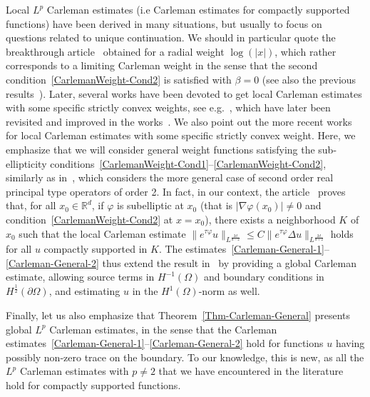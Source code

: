 \documentclass[AHL,Unicode,longabstracts]{cedram}
\newcommand*\R{\mathbb{R}}
\renewcommand{\leq}{\leqslant}
\begin{document}
Local $L^p$ Carleman estimates (i.e Carleman estimates for compactly supported functions) have been derived in many situations, but usually to focus on questions related to unique continuation. We should in particular quote the breakthrough article~\cite{jerison1985unique} obtained for a radial weight $\log(|x|)$, which rather corresponds to a limiting Carleman weight in the sense that the second condition~\eqref{CarlemanWeight-Cond2} is satisfied with $\beta = 0$ (see also the previous results~\cite{Amrein-Berthier-Georgescu-1981, Hormander-Uniqueness-1983}). Later, several works have been devoted to get local Carleman estimates with some specific strictly convex weights, see e.g.~\cite{barcelo1988weighted,Sogge1989uniquecontinuation,Sogge.Strong.Elliptic1990}, which have later been revisited and improved in the works~\cite{koch2001carleman,ferreira2003sharp}. We also point out the more recent works~\cite{davey2020quantitative,davey2019quantitative} for local Carleman estimates with some specific strictly convex weight. Here, we emphasize that we will consider general weight functions satisfying the sub-ellipticity conditions~\eqref{CarlemanWeight-Cond1}--\eqref{CarlemanWeight-Cond2}, similarly as in~\cite{ferreira2003sharp}, which considers the more general case of second order real principal type operators of order 2. In fact, in our context, the article~\cite{ferreira2003sharp} proves that, for all $x_0 \in \R^d$, if $\varphi$ is subelliptic at $x_0$ (that is $|\nabla \varphi(x_0)| \neq 0$ and condition~\eqref{CarlemanWeight-Cond2} at $x = x_0$), there exists a neighborhood $K$ of $x_0$ such that the local Carleman estimate $\| e^{\tau \varphi} u \|_{L^{\frac{2d}{d-2}}} \leq C \| e^{\tau \varphi} \Delta u \|_{L^{\frac{2d}{d+2}}}$ holds for all $u$ compactly supported in $K$. The estimates~\eqref{Carleman-General-1}--\eqref{Carleman-General-2} thus extend the result in~\cite{ferreira2003sharp} by providing a global Carleman estimate, allowing source terms in $H^{-1}(\Omega)$ and boundary conditions in $H^{\frac{1}{2}}(\partial \Omega)$, and estimating $u$ in the $H^1(\Omega)$-norm as well.

Finally, let us also emphasize that Theorem~\ref{Thm-Carleman-General} presents global $L^p$ Carleman estimates, in the sense that the Carleman estimates~\eqref{Carleman-General-1}--\eqref{Carleman-General-2} hold for functions $u$ having possibly non-zero trace on the boundary. To our knowledge, this is new, as all the $L^p$ Carleman estimates with $p \neq 2$ that we have encountered in the literature hold for compactly supported functions.
\end{document}
